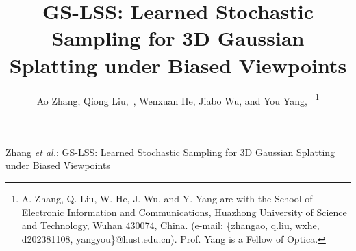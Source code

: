 \documentclass[lettersize,journal]{IEEEtran}
\begin{document}
\title{GS-LSS: Learned Stochastic Sampling for 3D Gaussian Splatting under Biased Viewpoints}

\author{Ao Zhang,
Qiong Liu,~, 
Wenxuan He, Jiabo Wu,
and You Yang,~
\thanks{A. Zhang, Q. Liu, W. He, J. Wu, and Y. Yang are with the School of Electronic Information and Communications, Huazhong University of Science and Technology, Wuhan 430074, China. (e-mail: \{zhangao, q.liu, wxhe, d202381108, yangyou\}@hust.edu.cn). Prof. Yang is a Fellow of Optica.}
}

%
{Zhang \MakeLowercase{\textit{et al.}}: GS-LSS: Learned Stochastic Sampling for 3D Gaussian Splatting under Biased Viewpoints}


\maketitle
\end{document}
